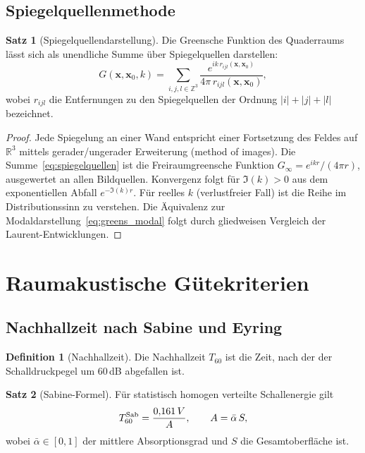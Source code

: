 ﻿\documentclass[12pt, a4paper]{article}
\theoremstyle{definition}
\newtheorem{definition}{Definition}[section]
\newtheorem{satz}{Satz}[section]
\theoremstyle{remark}
\newcommand{\R}{\mathbb{R}}
\begin{document}
\subsection{Spiegelquellenmethode}

\begin{satz}[Spiegelquellendarstellung]
\label{satz:spiegelquellen}
Die Greensche Funktion des Quaderraums lässt sich als unendliche Summe
über Spiegelquellen darstellen:
\begin{equation}
  G(\mathbf{x},\mathbf{x}_0,k)
  = \sum_{i,j,l \in \mathbb{Z}^3}
    \frac{e^{ik\,r_{ijl}(\mathbf{x},\mathbf{x}_0)}}{4\pi\,r_{ijl}(\mathbf{x},\mathbf{x}_0)},
  \label{eq:spiegelquellen}
\end{equation}
wobei $r_{ijl}$ die Entfernungen zu den Spiegelquellen der Ordnung $|i|+|j|+|l|$
bezeichnet.
\end{satz}

\begin{proof}
Jede Spiegelung an einer Wand entspricht einer Fortsetzung des Feldes auf
$\R^3$ mittels gerader/ungerader Erweiterung (method of images).
Die Summe~\eqref{eq:spiegelquellen} ist die Freiraumgreensche Funktion
$G_\infty = e^{ikr}/(4\pi r)$, ausgewertet an allen Bildquellen.
Konvergenz folgt für $\Im(k) > 0$ aus dem exponentiellen Abfall $e^{-\Im(k)r}$.
Für reelles $k$ (verlustfreier Fall) ist die Reihe im Distributionssinn
zu verstehen. Die Äquivalenz zur Modaldarstellung~\eqref{eq:greens_modal}
folgt durch gliedweisen Vergleich der Laurent-Entwicklungen. 
\end{proof}

\section{Raumakustische Gütekriterien}
\label{sec:raumakustik}

\subsection{Nachhallzeit nach Sabine und Eyring}

\begin{definition}[Nachhallzeit]
Die Nachhallzeit $T_{60}$ ist die Zeit, nach der der Schalldruckpegel
um 60\,dB abgefallen ist.
\end{definition}

\begin{satz}[Sabine-Formel]
\label{satz:sabine}
Für statistisch homogen verteilte Schallenergie gilt
\begin{equation}
  T_{60}^{\rm Sab} = \frac{0{,}161\,V}{A},
  \qquad A = \bar{\alpha}\,S,
  \label{eq:sabine}
\end{equation}
wobei $\bar{\alpha} \in [0,1]$ der mittlere Absorptionsgrad
und $S$ die Gesamtoberfläche ist.
\end{satz}
\end{document}
